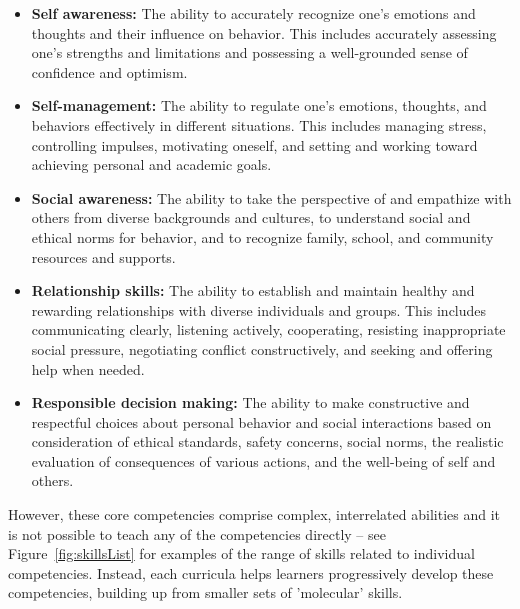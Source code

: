 \documentclass[prodmode,acmtochi]{acmsmall}
\newcommand{\todo}[1]{\textrm{\textrm{\textcolor{LightBlue}{[[#1]]}}}}
\newcommand{\GeraldineFIXNEW}[1]{}
\begin{document}
%
%


\GeraldineFIXNEW{ GF NOTE: possessive apostrophes below didn't print out in my pdf version}
\begin{itemize}
        \item {\bf Self awareness: }
                        The ability to accurately recognize one's emotions and thoughts and their influence on behavior. This includes accurately assessing one's strengths and limitations and possessing a well-grounded sense of confidence and optimism.
        \item {\bf Self-management: }
                         The ability to regulate one's emotions, thoughts, and behaviors effectively in different situations. This includes managing stress, controlling impulses, motivating oneself, and setting and working toward achieving personal and academic goals.
        \item {\bf Social awareness: }
                         The ability to take the perspective of and empathize with others from diverse backgrounds and cultures, to understand social and ethical norms for behavior, and to recognize family, school, and community resources and supports.
        \item {\bf Relationship skills: }
                        The ability to establish and maintain healthy and rewarding relationships with diverse individuals and groups. This includes communicating clearly, listening actively, cooperating, resisting inappropriate social pressure, negotiating conflict constructively, and seeking and offering help when needed.
        \item {\bf Responsible decision making: }
                        The ability to make constructive and respectful choices about personal behavior and social interactions based on consideration of ethical standards, safety concerns, social norms, the realistic evaluation of consequences of various actions, and the well-being of self and others.
\end{itemize}

However, these core competencies comprise complex, interrelated abilities and it is not possible to teach any of the competencies directly -- see Figure~\ref{fig:skillsList} for examples of the range of skills related to individual competencies. 
Instead, each curricula helps learners progressively develop these competencies, building up from smaller sets of 'molecular' skills. 
\end{document}
